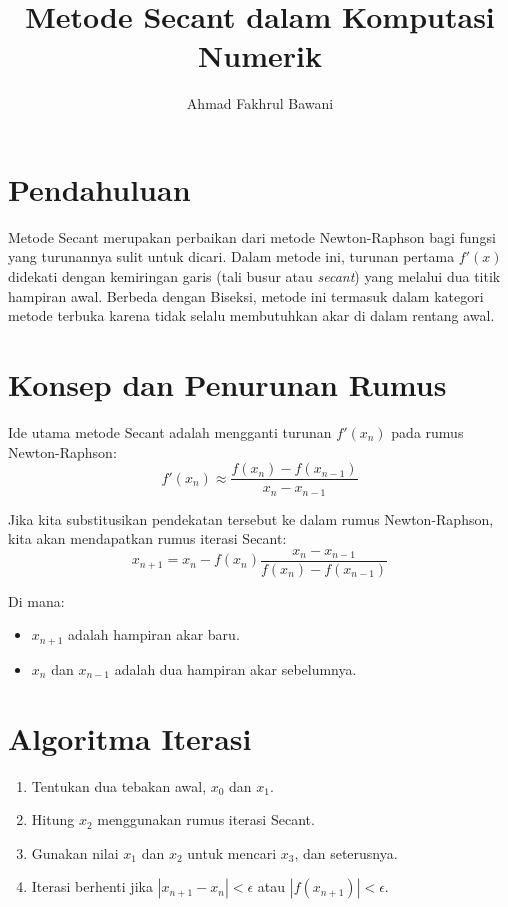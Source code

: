 \documentclass[12pt,a4paper]{article}
\title{Metode Secant dalam Komputasi Numerik}
\author{Ahmad Fakhrul Bawani}
\date{}
\begin{document}
\maketitle

\section{Pendahuluan}
Metode Secant merupakan perbaikan dari metode Newton-Raphson bagi fungsi yang turunannya sulit untuk dicari. Dalam metode ini, turunan pertama $f'(x)$ didekati dengan kemiringan garis (tali busur atau \textit{secant}) yang melalui dua titik hampiran awal. Berbeda dengan Biseksi, metode ini termasuk dalam kategori metode terbuka karena tidak selalu membutuhkan akar di dalam rentang awal.

\section{Konsep dan Penurunan Rumus}
Ide utama metode Secant adalah mengganti turunan $f'(x_n)$ pada rumus Newton-Raphson:
\begin{equation}
f'(x_n) \approx \frac{f(x_n) - f(x_{n-1})}{x_n - x_{n-1}}
\end{equation}

Jika kita substitusikan pendekatan tersebut ke dalam rumus Newton-Raphson, kita akan mendapatkan rumus iterasi Secant:
\begin{equation}
x_{n+1} = x_n - f(x_n) \frac{x_n - x_{n-1}}{f(x_n) - f(x_{n-1})}
\end{equation}

Di mana:
\begin{itemize}
  \item $x_{n+1}$ adalah hampiran akar baru.
  \item $x_n$ dan $x_{n-1}$ adalah dua hampiran akar sebelumnya.
\end{itemize}

\section{Algoritma Iterasi}
\begin{enumerate}
  \item Tentukan dua tebakan awal, $x_0$ dan $x_1$.
  \item Hitung $x_2$ menggunakan rumus iterasi Secant.
  \item Gunakan nilai $x_1$ dan $x_2$ untuk mencari $x_3$, dan seterusnya.
  \item Iterasi berhenti jika $|x_{n+1} - x_n| < \epsilon$ atau $|f(x_{n+1})| < \epsilon$.
\end{enumerate}
\end{document}
